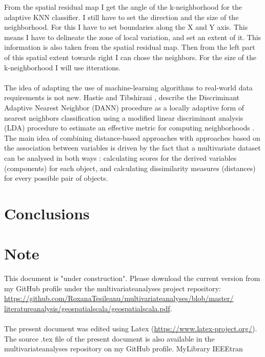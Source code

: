\documentclass {article}
\begin{document}
From the spatial residual map I get the angle of the k-neighborhood for the adaptive KNN classifier. I still have to set the direction and the size of the neighborhood. For this I have to set boundaries along the X and Y axis. This means I have to delineate the zone of local variation, and set an extent of it. This information is also taken from the spatial residual map. Then from the left part of this spatial extent towards right I can chose the neighbors. For the size of the k-neighborhood I will use itterations.        
\\
\\
The idea of adapting the use of machine-learning algorithms to real-world data requirements is not new. 
Hastie and Tibshirani \cite{hastie_discriminant_1996}, describe the Discriminant Adaptive Nearest Neighbor (DANN) procedure as a locally adaptive form of nearest neighbors classification using a modified linear discriminant analysis (LDA) procedure to estimate an effective metric for computing neighborhoods \cite{tesileanu_introduction_2017}.
The main idea of combining distance-based approaches with approaches based on the association between variables is driven by the fact that a multivariate dataset can be analysed in both ways \cite{quinn_experimental_2002}: calculating scores for the derived variables (components) for each object, and calculating dissimilarity measures (distances) for every possible pair of objects.\\

\section {Conclusions} 

\section* {Note}
This document is "under construction". Please download the current version from  my GitHub profile under the multivariate\underline{\space}analyses project repository: \href{https://github.com/RoxanaTesileanu/multivariate_analyses/blob/master/literature_analysis/geospatial_scala/geospatial_scala.pdf}{https://github.com/RoxanaTesileanu/multivariate\underline{\space}analyses/blob/master/\\literature\underline{\space}analysis/geospatial\underline{\space}scala/geospatial\underline{\space}scala.pdf}. 
\\
\\
The present document was edited using Latex \cite{claudio_latex-tutorial.com_nodate} (\href{https://www.latex-project.org/}{https://www.latex-project.org/}). The source .tex file of the present document is also available in the multivariate\underline{\space}analyses repository on my GitHub profile.  
 {MyLibrary}
 {IEEEtran}
\end{document}
